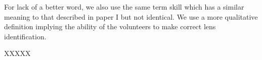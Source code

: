 \documentclass[useAMS,usenatbib,a4paper]{mn2e}
\begin{document}
For lack of a better word, we also use the same term skill which has a
similar meaning to that described in paper I but not identical. We use a
more qualitative definition implying the ability of the volunteers to
make correct lens identification. 

XXXXX



% 



%



\label{lastpage}
\bsp
\end{document}
